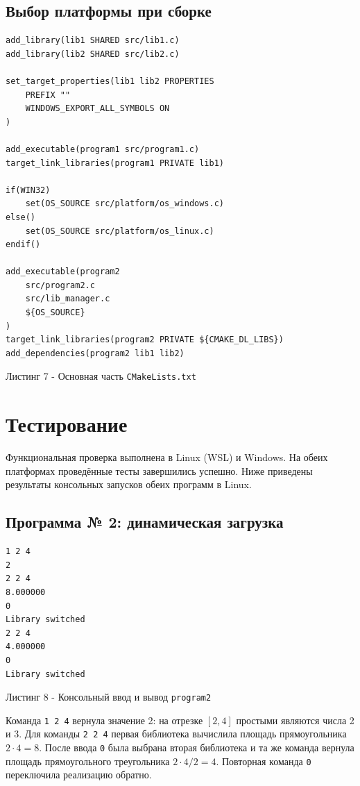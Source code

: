 \documentclass[12pt,a4paper]{article}
\begin{document}
\subsection{Выбор платформы при сборке}
\begin{lstlisting}[language={}]
add_library(lib1 SHARED src/lib1.c)
add_library(lib2 SHARED src/lib2.c)

set_target_properties(lib1 lib2 PROPERTIES
    PREFIX ""
    WINDOWS_EXPORT_ALL_SYMBOLS ON
)

add_executable(program1 src/program1.c)
target_link_libraries(program1 PRIVATE lib1)

if(WIN32)
    set(OS_SOURCE src/platform/os_windows.c)
else()
    set(OS_SOURCE src/platform/os_linux.c)
endif()

add_executable(program2
    src/program2.c
    src/lib_manager.c
    ${OS_SOURCE}
)
target_link_libraries(program2 PRIVATE ${CMAKE_DL_LIBS})
add_dependencies(program2 lib1 lib2)
\end{lstlisting}
\begin{center}\small Листинг 7 - Основная часть \texttt{CMakeLists.txt}\end{center}

\section{Тестирование}
Функциональная проверка выполнена в Linux (WSL) и Windows. На обеих платформах проведённые тесты завершились успешно. Ниже приведены результаты консольных запусков обеих программ в Linux.

\subsection{Программа № 2: динамическая загрузка}
\begin{lstlisting}[language={},numbers=none]
1 2 4
2
2 2 4
8.000000
0
Library switched
2 2 4
4.000000
0
Library switched
\end{lstlisting}
\begin{center}\small Листинг 8 - Консольный ввод и вывод \texttt{program2}\end{center}

Команда \texttt{1 2 4} вернула значение 2: на отрезке $[2,4]$ простыми являются числа 2 и 3. Для команды \texttt{2 2 4} первая библиотека вычислила площадь прямоугольника $2\cdot4=8$. После ввода \texttt{0} была выбрана вторая библиотека и та же команда вернула площадь прямоугольного треугольника $2\cdot4/2=4$. Повторная команда \texttt{0} переключила реализацию обратно.
\end{document}
